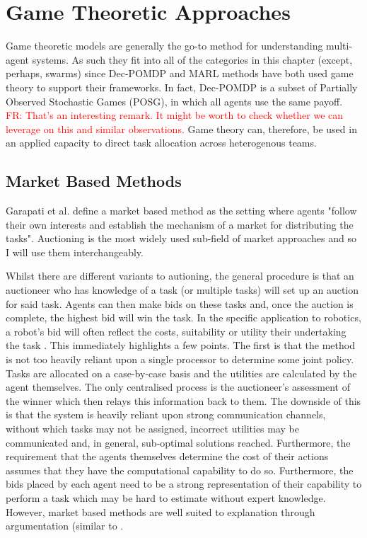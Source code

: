 \documentclass[preprint,11pt]{report}
\newcommand\fr[1]{\textcolor{red}{FR: #1}}
\begin{document}
\section{Game Theoretic Approaches}

Game theoretic models are generally the go-to method for understanding
multi-agent systems. As such they fit into all of the categories in
this chapter (except, perhaps, swarms) since Dec-POMDP and MARL
methods have both used game theory to support their frameworks. In
fact, Dec-POMDP is a subset of Partially Observed Stochastic Games
(POSG), in which all agents use the same payoff. \fr{That's an
  interesting remark. It might be worth to check whether we can
  leverage on this and similar observations.} Game theory can,
therefore, be used in an applied capacity to direct task allocation
across heterogenous teams.

\subsection{Market Based Methods}

Garapati et al. \cite{Garapati2018AMissions} define a market based
method as the setting where agents "follow their own interests and
establish the mechanism of a market for distributing the
tasks". Auctioning is the most widely used sub-field of market
approaches and so I will use them interchangeably.

Whilst there are different variants to autioning, the general
procedure is that an auctioneer who has knowledge of a task (or
multiple tasks) will set up an auction for said task. Agents can then
make bids on these tasks and, once the auction is complete, the
highest bid will win the task. In the specific application to
robotics, a robot's bid will often reflect the costs, suitability or
utility their undertaking the task
\cite{BernardineDias2006Market-basedAnalysis}. This immediately
highlights a few points. The first is that the method is not too
heavily reliant upon a single processor to determine some joint
policy. Tasks are allocated on a case-by-case basis and the utilities
are calculated by the agent themselves. The only centralised process
is the auctioneer's assessment of the winner which then relays this
information back to them. The downside of this is that the system is
heavily reliant upon strong communication channels, without which
tasks may not be assigned, incorrect utilities may be communicated
and, in general, sub-optimal solutions reached.  Furthermore, the
requirement that the agents themselves determine the cost of their
actions assumes that they have the computational capability to do
so. Furthermore, the bids placed by each agent need to be a strong
representation of their capability to perform a task which may be hard
to estimate without expert knowledge. However, market based methods
are well suited to explanation through argumentation (similar to
\cite{Jung2001DistributedArgumentation}.
\end{document}
